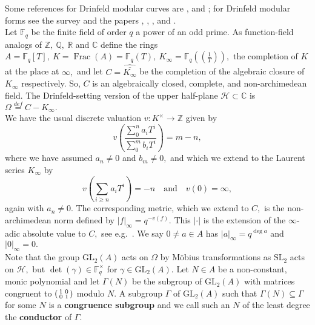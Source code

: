 \documentclass[11pt]{amsart}
\theoremstyle{definition}
\newenvironment{psmallmatrix}
{\left(\begin{smallmatrix}}
	{\end{smallmatrix}\right)}
\numberwithin{equation}{section}
\newcommand{\GL}{\mathrm{GL}} 	%
\newcommand{\SL}{\mathrm{SL}} 	%
\newcommand{\cH}{\mathcal{H}}		%
\newcommand{\bbC}{\mathbb{C}}		%
\newcommand{\bbF}{\mathbb{F}}		%
\newcommand{\bbQ}{\mathbb{Q}}		%
\newcommand{\bbR}{\mathbb{R}}		%
\newcommand{\bbZ}{\mathbb{Z}}		%
\begin{document}
		Some references for Drinfeld modular curves are \cite{Gekeler-Curves}, \cite{Gekeler-Invariants} and \cite{Mason-Schweizer-elliptic-pts-Drinfeld-modular-grps}; for Drinfeld modular forms see the survey \cite{Gekeler-survey-Drinfeld-modular-forms} and the papers \cite{Gekeler-jacobians}, \cite{Gekeler-Coeff}, \cite{Breuer-Gekeler-h-function}, \cite{Cornelissen-lvlT} and \cite{Dalal-Kumar-Gamma_0(T)-structure}.\\
		
		Let $\bbF_q$ be the finite field of order $q$ a power of an odd prime. As function-field analogs of $\bbZ,~\bbQ,~\bbR$ and $\bbC$ define the rings $\displaystyle{A=\bbF_q[T], ~K=\operatorname{Frac}(A)=\bbF_q(T), ~K_{\infty}=\bbF_q\left(\!\left(\frac{1}{T}\right)\!\right)},$ the completion of $K$ at the place at $\infty,$ and let $C=\widehat{\overline{K_{\infty}}}$ be the completion of the algebraic closure of $K_{\infty}$ respectively. So, $C$ is an algebraically closed, complete, and non-archimedean field. The Drinfeld-setting version of the upper half-plane $\cH\subset \bbC$ is $\Omega\overset{def}{=}C-K_{\infty}.$ \\
		
		We have the usual discrete valuation $v: K^{\times}\to \bbZ$ given by 
		\[v\left(\frac{\sum_0^n a_iT^i}{\sum_0^m b_iT^i}\right)=m-n,\] where we have assumed $a_n\neq 0$ and $b_m\neq 0,$ and which we extend to the Laurent series $K_{\infty}$ by 
		\[v\left(\sum_{i\geq n}a_iT^i\right)=-n\quad\text{and}\quad v(0)=\infty,\] again with $a_n\neq 0.$ The corresponding metric, which we extend to $C,$ is the non-archimedean norm defined by $|f|_{\infty}=q^{-v(f)}.$ This $|\cdot|$ is the extension of the $\infty$-adic absolute value to $C,$ see e.g.\ \cite[Section $(2.2)$]{Poonen-DrinfeldIntro}. We say $0\neq a\in A$ has $|a|_{\infty}=q^{\deg a}$ and $|0|_{\infty}=0.$ \\
		
		
		Note that the group $\GL_2(A)$ acts on $\Omega$ by M\"obius transformations as $\SL_2$ acts on $\cH,$ but $\det(\gamma)\in \bbF_q^{\times}$ for $\gamma\in \GL_2(A).$ Let $N\in A$ be a non-constant, monic polynomial and let $\Gamma(N)$ be the subgroup of $\GL_2(A)$ with matrices congruent to $\begin{psmallmatrix}1&0\\0&1\end{psmallmatrix}$ modulo $N.$ A subgroup $\Gamma$ of $\GL_2(A)$ such that $\Gamma(N)\subseteq \Gamma$ for some $N$ is a \textbf{congruence subgroup} and we call such an $N$ of the least degree the \textbf{conductor} of $\Gamma.$ \\
		
\end{document}
